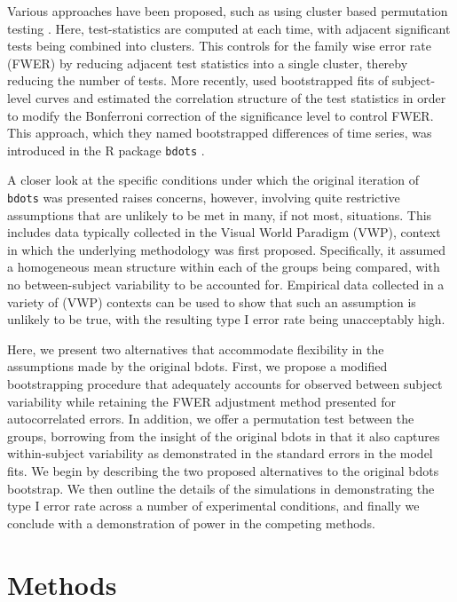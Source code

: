 \documentclass{article}
\newcommand{\xt}{\texttt}
\begin{document}
Various approaches have been proposed, such as using cluster based permutation testing \cite{Maris2007}. Here, test-statistics are computed at each time, with adjacent significant tests being combined into clusters. This controls for the family wise error rate (FWER) by reducing adjacent test statistics into a single cluster, thereby reducing the number of tests. More recently, \cite{oleson2017detecting} used bootstrapped fits of subject-level curves and estimated the correlation structure of the test statistics in order to modify the Bonferroni correction of the significance level to control FWER. This approach, which they named bootstrapped differences of time series, was introduced in the R package \xt{bdots} \cite{seedorff2018bdots}.

A closer look at the specific conditions under which the original iteration of \xt{bdots} was presented raises concerns, however, involving quite restrictive assumptions that are unlikely to be met in many, if not most, situations. This includes data typically collected in the Visual World Paradigm (VWP), context in which the underlying methodology was first proposed. Specifically, it assumed a homogeneous mean structure within each of the groups being compared, with no between-subject variability to be accounted for. Empirical data collected in a variety of (VWP) contexts can be used to show that such an assumption is unlikely to be true, with the resulting type I error rate being unacceptably high.

Here, we present two alternatives that accommodate flexibility in the assumptions made by the original bdots. First, we propose a modified bootstrapping procedure that adequately accounts for observed between subject variability while retaining the FWER adjustment method presented for autocorrelated errors. In addition, we offer a permutation test between the groups, borrowing from the insight of the original bdots in that it also captures within-subject variability as demonstrated in the standard errors in the model fits. We begin by describing the two proposed alternatives to the original bdots bootstrap. We then outline the details of the simulations in demonstrating the type I error rate across a number of experimental conditions, and finally we conclude with a demonstration of power in the competing methods.

\section{Methods}
\end{document}
